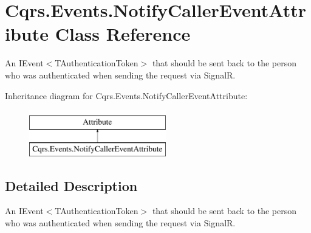 \hypertarget{classCqrs_1_1Events_1_1NotifyCallerEventAttribute}{}\section{Cqrs.\+Events.\+Notify\+Caller\+Event\+Attribute Class Reference}
\label{classCqrs_1_1Events_1_1NotifyCallerEventAttribute}


An I\+Event$<$\+T\+Authentication\+Token$>$ that should be sent back to the person who was authenticated when sending the request via SignalR.  


Inheritance diagram for Cqrs.\+Events.\+Notify\+Caller\+Event\+Attribute\+:\begin{figure}[H]
\begin{center}
\leavevmode
\includegraphics[height=2.000000cm]{classCqrs_1_1Events_1_1NotifyCallerEventAttribute}
\end{center}
\end{figure}


\subsection{Detailed Description}
An I\+Event$<$\+T\+Authentication\+Token$>$ that should be sent back to the person who was authenticated when sending the request via SignalR. 

